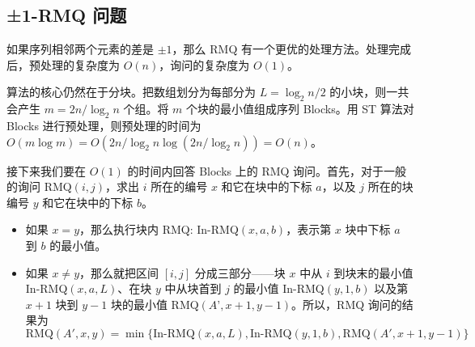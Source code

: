 \subsection{±1-RMQ 问题}
	如果序列相邻两个元素的差是 $\pm 1$，那么 RMQ 有一个更优的处理方法。处理完成后，预处理的复杂度为 $O(n)$，询问的复杂度为 $O(1)$。
	
	算法的核心仍然在于分块。把数组划分为每部分为 $L=\log _{2}n/2$ 的小块，则一共会产生 $m=2n/\log _{2}n$ 个组。将 $m$ 个块的最小值组成序列 Blocks。用 ST 算法对 Blocks 进行预处理，则预处理的时间为 $O(m\log m)=O(2n/\log _{2}n\log(2n/\log _{2}{}n))=O(n)$。
	
	接下来我们要在 $O(1)$ 的时间内回答 Blocks 上的 RMQ 询问。首先，对于一般的询问 RMQ$(i,j)$，求出 $i$ 所在的编号 $x$ 和它在块中的下标 $a$，以及 $j$ 所在的块编号 $y$ 和它在块中的下标 $b$。
	
	\begin{itemize}
		\item 如果 $x=y$，那么执行块内 RMQ: In-RMQ$(x,a,b)$，表示第 $x$ 块中下标 $a$ 到 $b$ 的最小值。
		\item 如果 $x\neq y$，那么就把区间 $[i,j]$ 分成三部分------块 $x$ 中从 $i$ 到块末的最小值 In-RMQ$(x, a, L)$、在块 $y$ 中从块首到 $j$ 的最小值 In-RMQ$(y,1,b)$ 以及第 $x+1$ 块到 $y-1$ 块的最小值 RMQ$(A’,x+1,y-
		1)$。所以，RMQ 询问的结果为 $\textrm{RMQ}(A',x,y)=\min\{\textrm{In-RMQ}(x,a,L),\textrm{In-RMQ}(y,1,b),\textrm{RMQ}(A',x+1,y-1)\}$
	\end{itemize}
	
	
	